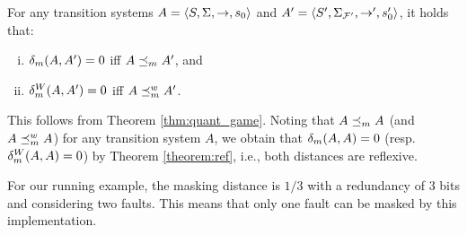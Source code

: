\begin{thm}\label{theorem:ref}
  For any transition systems $A = \langle S, \Sigma, \rightarrow, s_0 \rangle$ and $A' = \langle S', \Sigma_{\mathcal{F'}}, \rightarrow', s'_0 \rangle$, it holds that:
  \begin{enumerate}[(i)]
  \item  $\delta_{m}(A,A') = 0$ iff $A \preceq_{m} A'$, and
   \item $\delta_{m}^W(A,A') = 0$ iff $A \preceq^w_{m} A' $.
  \end{enumerate}
\end{thm}
%
This follows from Theorem \ref{thm:quant_game}.
Noting that $A \preceq_{m} A$ (and $A \preceq^w_{m} A$) for 
any transition system $A$, we obtain that $\delta_{m}(A,A)=0$ (resp.\ $\delta_{m}^W(A,A)=0$) by Theorem \ref{theorem:ref}, i.e., 
both distances are reflexive.

For our running example, the masking distance is $1/3$ 
with a redundancy of $3$ bits and considering two faults. 
This means that only one fault can be masked by this implementation. \\

